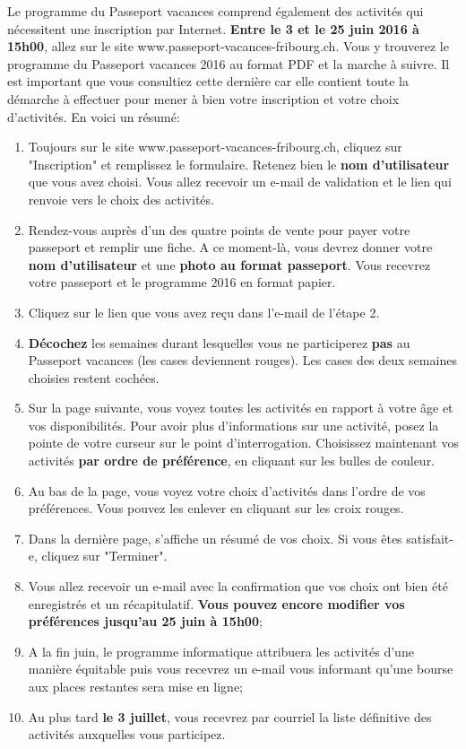 Le programme du Passeport vacances comprend également des activités qui nécessitent une inscription par Internet. 
\textbf{Entre le 3 et le 25 juin 2016 à 15h00}, allez sur le site www.passeport-vacances-fribourg.ch. Vous y trouverez le programme du Passeport vacances 2016 au format PDF et la marche à suivre. Il est important que vous consultiez cette dernière car elle contient toute la démarche à effectuer pour mener à bien votre inscription et votre choix d'activités. En voici un résumé:

\begin{enumerate}
\item Toujours sur le site www.passeport-vacances-fribourg.ch, cliquez sur "Inscription" et remplissez le formulaire. Retenez bien le \textbf{nom d'utilisateur} que vous avez choisi. Vous allez recevoir un e-mail de validation et le lien qui renvoie vers le choix des activités. 
\item Rendez-vous auprès d'un des quatre points de vente pour payer votre passeport et remplir une fiche. A ce moment-là, vous devrez donner votre \textbf{nom d'utilisateur} et une \textbf{photo au format passeport}. Vous recevrez votre passeport et le programme 2016 en format papier.
\item Cliquez sur le lien que vous avez reçu dans l'e-mail de l'étape 2.
\item \textbf{Décochez} les semaines durant lesquelles vous ne participerez \textbf{pas} au Passeport vacances (les cases deviennent rouges). Les cases des deux semaines choisies restent cochées. 
\item Sur la page suivante, vous voyez toutes les activités en rapport à votre âge et vos disponibilités. Pour avoir plus d'informations sur une activité, posez la pointe de votre curseur sur le point d'interrogation. Choisissez maintenant vos activités \textbf{par ordre de préférence}, en cliquant sur les bulles de couleur.
\item Au bas de la page, vous voyez votre choix d'activités dans l'ordre de vos préférences. Vous pouvez les enlever en cliquant sur les croix rouges. 
\item Dans la dernière page, s'affiche un résumé de vos choix. Si vous êtes satisfait-e, cliquez sur "Terminer". 
\item Vous allez recevoir un e-mail avec la confirmation que vos choix ont bien été enregistrés et un récapitulatif. \textbf{Vous pouvez encore modifier vos préférences jusqu'au 25 juin à 15h00};
\item A la fin juin, le programme informatique attribuera les activités d'une manière équitable puis vous recevrez un e-mail vous informant qu'une bourse aux places restantes sera mise en ligne;
\item Au plus tard \textbf{le 3 juillet}, vous recevrez par courriel la liste définitive des activités auxquelles vous participez. 
\end{enumerate}

